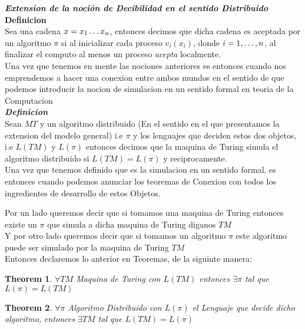 \documentclass[11pt]{article}
\newtheorem{theorem}{Theorem}
\begin{document}
    \textbf{\emph{Extension de la noción de Decibilidad en el sentido Distribuido}}\\
    \textbf{Definicion}\\
    Sea una cadena $x = x_{1}\mathellipsis x_{n}$, entonces decimos que dicha cadena es aceptada
    por un algoritmo $\pi$ si al inicializar cada proceso $v_{i}(x_{i})$, donde $i = 1,\mathellipsis,n$,
    al finalizar el computo al menos un proceso \emph{acepta} localmente.
    \\

    Una vez que tenemos en mente las nociones anteriores es entonces cuando nos emprendemos
    a hacer una conexion entre ambos mundos en el sentido de que podemos introducir la nocion de
    simulacion en un sentido formal en teoria de la Computacion
    \\
    \textbf{\emph{Definicion}}\\
    Sean $MT$ y un algoritmo distribuido (En el sentido en el que presentamos la extension del modelo
    general) i.e $\pi$ y los lenguajes que deciden estos dos objetos, i.e $L(TM)$ y $L(\pi)$
    entonces decimos que la maquina de Turing simula el algoritmo distribuido si $L(TM) = L(\pi)$
    y reciprocamente.\\

    Una vez que tenemos definido que es la simulacion en un sentido formal, es entonces cuando podemos
    anunciar los teoremas de Conexion con todos los ingredientes de desarrollo de estos Objetos.


    Por un lado queremos decir que si tomamos una maquina de Turing entonces existe un $\pi$ que
    simula a dicha maquina de Turing diganos $TM$ \\

    Y por otro lado queremos decir que si tomamos un algoritmo $\pi$
    este algoritmo puede ser simulado por la maquina de Turing $TM$\\

    Entonces declaremos lo anterior en Teoremas, de la siguinte manera:
    \\
    \begin{theorem}
        $\forall TM $ Maquina de Turing con $L(TM)$ entonces
       $ \exists \pi$ tal que $L(\pi) = L(TM)$
    \end{theorem}
    \begin{theorem}
        $\forall \pi$ Algoritmo Distribuido con $L(\pi)$ el Lenguaje que decide dicho
        algoritmo, entonces $\exists TM$ tal que $L(TM) = L(\pi)$
    \end{theorem}
\end{document}
